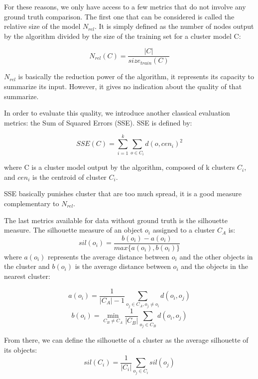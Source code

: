 For these reasons, we only have access to a few metrics that do not involve any ground truth comparison. The first one that can be considered is called the relative size of the model $N_{rel}$. It is simply defined as the number of nodes output by the algorithm divided by the size of the training set for a cluster model C: 

\begin{equation}
    N_{rel}(C) = \frac{|C|}{size_{train}(C)}
\end{equation}

$N_{rel}$ is basically the reduction power of the algorithm, it represents its capacity to summarize its input. However, it gives no indication about the quality of that summarize.

In order to evaluate this quality, we introduce another classical evaluation metrics: the Sum of Squared Errors (SSE)\cite{sse-silhouette}. SSE is defined by:

\begin{equation}
    SSE(C) = \sum_{i=1}^k\sum_{o \in C_i}d(o, cen_{i})^2
\end{equation}

where C is a cluster model output by the algorithm, composed of k clusters $C_i$, and $cen_i$ is the centroid of cluster $C_i$.

SSE basically punishes cluster that are too much spread, it is a good measure complementary to $N_{rel}$.

The last metrics available for data without ground truth is the silhouette measure. The silhouette measure of an object $o_i$ assigned to a cluster $C_A$ is:
\begin{equation}
    sil(o_i)= \frac{b(o_i) - a(o_i)}{max\{a(o_i), b(o_i)\}}
\end{equation}
where $a(o_i)$ represents the average distance between $o_i$ and the other objects in the cluster and $b(o_i)$ is the average distance between $o_i$ and the objects in the nearest cluster:

\begin{equation}
    a(o_i) = \frac{1}{|C_A|-1}\sum_{o_j \in C_A, o_j \neq o_i}d(o_i, o_j)
\end{equation}
\begin{equation}
    b(o_i)= \min_{C_B \neq C_A} \frac{1}{|C_B|} \sum_{o_j \in C_B}d(o_i, o_j)
\end{equation}

From there, we can define the silhouette of a cluster as the average silhouette of its objects:
\begin{equation}
    sil(C_i)=\frac{1}{|C_i|} \sum_{o_j \in C_i}sil(o_j)
\end{equation}

